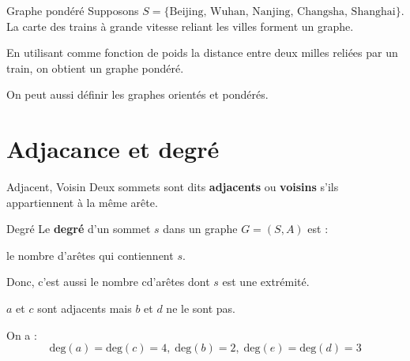 \begin{Example}{Graphe pondéré}{}
Supposons  $S = \{\text{Beijing, Wuhan, Nanjing, Changsha, Shanghai}\}$. La carte des trains à grande vitesse reliant les villes forment un graphe.

En utilisant comme fonction de poids la distance entre deux milles reliées par un train, on obtient un graphe pondéré.
\end{Example}

On peut aussi définir les graphes orientés et pondérés.

\section{Adjacance et degré}

\begin{Definition}[colbacktitle=red!75!black]{Adjacent, Voisin}{}
Deux sommets sont dits \textbf{adjacents} ou \textbf{voisins} s'ils appartiennent à la même arête.
\end{Definition}


\begin{Definition}[colbacktitle=red!75!black]{Degré}{}
Le \textbf{degré} d'un sommet $s$ dans un graphe $G= (S,A)$ est :
\begin{center}
le nombre d'arêtes qui contiennent $s$.
\end{center}
Donc, c'est aussi le nombre cd'arêtes dont $s$ est une extrémité.
\end{Definition}


\begin{Example}{}{}
\begin{center}
\end{center}
$a$ et $c$ sont adjacents mais $b$ et $d$ ne le sont pas.

On a :
    \[
    \mathrm{deg} (a) = \mathrm{deg} (c) = 4,\; \mathrm{deg} (b) = 2,\; \mathrm{deg} (e) = \mathrm{deg} (d) = 3
    \]
\end{Example}

